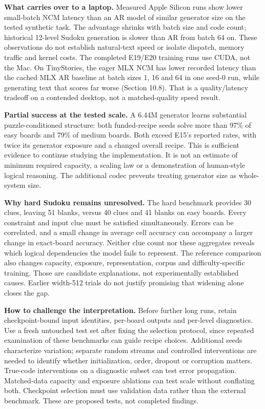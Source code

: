 \documentclass[
  british,
]{article}
\begin{document}
\textbf{What carries over to a laptop.} Measured Apple Silicon runs show
lower small-batch NCM latency than an AR model of similar generator size
on the tested synthetic task. The advantage shrinks with batch size and
code count; historical 12-level Sudoku generation is slower than AR from
batch 64 on. These observations do not establish natural-text speed or
isolate dispatch, memory traffic and kernel costs. The completed E19/E20
training runs use CUDA, not the Mac. On TinyStories, the eager MLX NCM
has lower recorded latency than the cached MLX AR baseline at batch
sizes 1, 16 and 64 in one seed-0 run, while generating text that scores
far worse (Section 10.8). That is a quality/latency tradeoff on a
contended desktop, not a matched-quality speed result.

\textbf{Partial success at the tested scale.} A 6.44M generator learns
substantial puzzle-conditioned structure: both funded-recipe seeds solve
more than 97\% of easy boards and 79\% of medium boards. Both exceed
E15's reported rates, with twice its generator exposure and a changed
overall recipe. This is sufficient evidence to continue studying the
implementation. It is not an estimate of minimum required capacity, a
scaling law or a demonstration of human-style logical reasoning. The
additional codec prevents treating generator size as whole-system size.

\textbf{Why hard Sudoku remains unresolved.} The hard benchmark provides
30 clues, leaving 51 blanks, versus 40 clues and 41 blanks on easy
boards. Every constraint and input clue must be satisfied
simultaneously. Errors can be correlated, and a small change in average
cell accuracy can accompany a larger change in exact-board accuracy.
Neither clue count nor these aggregates reveals which logical
dependencies the model fails to represent. The reference comparison also
changes capacity, exposure, representation, corpus and
difficulty-specific training. Those are candidate explanations, not
experimentally established causes. Earlier width-512 trials do not
justify promising that widening alone closes the gap.

\textbf{How to challenge the interpretation.} Before further long runs,
retain checkpoint-bound input identities, per-board outputs and
per-level diagnostics. Use a fresh untouched test set after fixing the
selection protocol, since repeated examination of these benchmarks can
guide recipe choices. Additional seeds characterize variation; separate
random streams and controlled interventions are needed to identify
whether initialization, order, dropout or corruption matters. True-code
interventions on a diagnostic subset can test error propagation.
Matched-data capacity and exposure ablations can test scale without
conflating both. Checkpoint selection must use validation data rather
than the external benchmark. These are proposed tests, not completed
findings.
\end{document}
